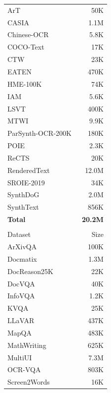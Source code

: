\begin{table}[!h]
\begin{minipage}[t]{0.245\textwidth}
\begin{tabular}{lr}
ArT~\cite{chng2019icdar} & 50K \\
CASIA~\cite{liu2011casia} & 1.1M \\
Chinese-OCR~\cite{xu2018chineseocr} & 5.8K \\
COCO-Text~\cite{veit2016cocotext} & 17K \\
CTW~\cite{yuan2019ctw} & 23K \\
EATEN~\cite{guo2019eaten} & 470K \\
HME-100K~\cite{yuan2022hme100k} & 74K \\
IAM~\cite{marti2002iam} & 5.6K \\
LSVT~\cite{sun2019icdar} & 400K \\
MTWI~\cite{he2018mtwi} & 9.9K \\
ParSynth-OCR-200K~\cite{singh2021parsynth} & 180K \\
POIE~\cite{kuang2023poie} & 2.3K \\
ReCTS~\cite{zhang2019icdar} & 20K \\
RenderedText~\cite{wendlerf2023renderedtext} & 12.0M \\
SROIE-2019~\cite{huang2019icdar} & 34K \\
SynthDoG~\cite{kim2022donut} & 2.0M \\
SynthText~\cite{gupta2016synthtext} & 856K \\
\midrule
\textbf{Total} & \textbf{20.2M} \\
\midrule
\rowcolor{instructcolor}\multicolumn{2}{l}{\textit{OCR QA}} \\
Dataset & Size \\
\midrule
ArXivQA~\cite{li2024multimodalarxiv} & 100K \\
Docmatix~\cite{laurencon2024building} & 1.3M \\
DocReason25K~\cite{hu2024docowl15} & 22K \\
DocVQA~\cite{mathew2021docvqa} & 40K \\
InfoVQA~\cite{mathew2022infographicvqa} & 1.2K \\
KVQA~\cite{shah2019kvqa} & 25K \\
LLaVAR~\cite{zhang2023llavar} & 437K \\
MapQA~\cite{chang2022mapqa} & 483K \\
MathWriting~\cite{gervais2024mathwriting} & 625K \\
MultiUI~\cite{liu2024harnessing} & 7.3M \\
OCR-VQA~\cite{mishra2019ocrvqa} & 803K \\
Screen2Words~\cite{wang2021screen2words} & 16K \\

\end{tabular}
\end{minipage}
\end{table}
